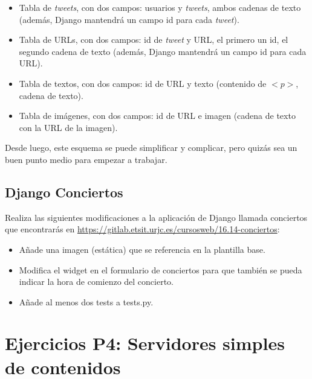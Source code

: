 \begin{itemize}
\item Tabla de \emph{tweets}, con dos campos: usuarios y \emph{tweets}, ambos cadenas de texto (además, Django mantendrá un campo id para cada \emph{tweet}).
\item Tabla de URLs, con dos campos: id de \emph{tweet} y URL, el primero un id, el segundo cadena de texto (además, Django mantendrá un campo id para cada URL).
\item Tabla de textos, con dos campos: id de URL y texto (contenido de $<p>$, cadena de texto).
\item Tabla de imágenes, con dos campos: id de URL e imagen (cadena de texto con la URL de la imagen).
\end{itemize}

Desde luego, este esquema se puede simplificar y complicar, pero quizás sea un buen punto medio para empezar a trabajar.

\subsection{Django Conciertos}
\label{subsec:django-conciertos}

Realiza las siguientes modificaciones a la aplicación de Django llamada conciertos que encontrarás en \url{https://gitlab.etsit.urjc.es/cursosweb/16.14-conciertos}:

\begin{itemize}
  \item Añade una imagen (estática) que se referencia en la plantilla base.
  \item Modifica el widget en el formulario de conciertos para que también se pueda indicar la hora de comienzo del concierto.
  \item Añade al menos dos tests a tests.py.
\end{itemize}

\section{Ejercicios P4: Servidores simples de contenidos}

